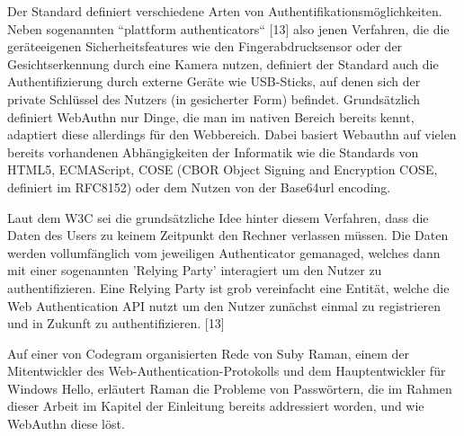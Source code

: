 Der Standard definiert verschiedene Arten von Authentifikationsmöglichkeiten. Neben sogenannten ``plattform authenticators`` [13] also jenen Verfahren, die die geräteeigenen Sicherheitsfeatures wie den Fingerabdrucksensor oder der Gesichtserkennung durch eine Kamera nutzen, definiert der Standard auch die Authentifizierung durch externe Geräte wie USB-Sticks, auf denen sich der private Schlüssel des Nutzers (in gesicherter Form) befindet. Grundsätzlich definiert WebAuthn nur Dinge, die man im nativen Bereich bereits kennt, adaptiert diese allerdings für den Webbereich. Dabei basiert Webauthn auf vielen bereits vorhandenen Abhängigkeiten der Informatik wie die Standards von HTML5, ECMAScript, COSE (CBOR Object Signing and Encryption COSE, definiert im RFC8152) oder dem Nutzen von der Base64url encoding.
\newpage

Laut dem W3C sei die grundsätzliche Idee hinter diesem Verfahren, dass die Daten des Users zu keinem Zeitpunkt den Rechner verlassen müssen. Die Daten werden vollumfänglich vom jeweiligen Authenticator gemanaged, welches dann mit einer sogenannten 'Relying Party' interagiert um den Nutzer zu authentifizieren. Eine Relying Party ist grob vereinfacht eine Entität, welche die Web Authentication API nutzt um den Nutzer zunächst einmal zu registrieren und in Zukunft zu authentifizieren. [13]

Auf einer von Codegram organisierten Rede von Suby Raman, einem der Mitentwickler des Web-Authentication-Protokolls und dem Hauptentwickler für Windows Hello, erläutert Raman die Probleme von Passwörtern, die im Rahmen dieser Arbeit im Kapitel der Einleitung bereits addressiert worden, und wie WebAuthn diese löst.

